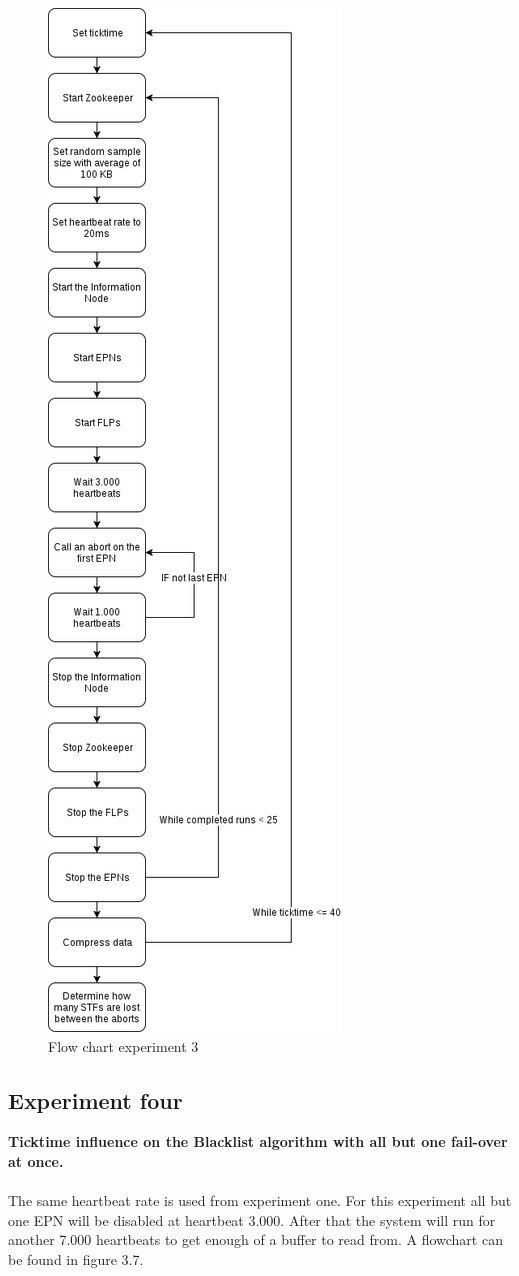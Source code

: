 \begin{figure}[htb]
    \centering
    \includegraphics[scale=0.3]{./graphics/ex3.png}
    \caption{Flow chart experiment 3}
\end{figure}

\subsection{Experiment four}
\textbf{Ticktime influence on the Blacklist algorithm with all but one fail-over at once.}
\\\\
The same heartbeat rate is used from experiment one. For this experiment all but one EPN will be disabled at heartbeat 3.000. After that the system will run for another 7.000 heartbeats to get enough of a buffer to read from. A flowchart can be found in figure 3.7.
